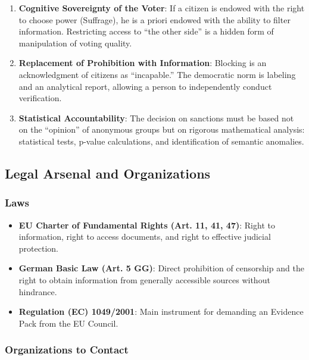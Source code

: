 \documentclass[11pt,a4paper]{article}
\theoremstyle{definition}
\theoremstyle{remark}
\begin{document}
\begin{enumerate}
\item \textbf{Cognitive Sovereignty of the Voter}: If a citizen is endowed with the right to choose power (Suffrage), he is a priori endowed with the ability to filter information. Restricting access to ``the other side'' is a hidden form of manipulation of voting quality.

\item \textbf{Replacement of Prohibition with Information}: Blocking is an acknowledgment of citizens as ``incapable.'' The democratic norm is labeling and an analytical report, allowing a person to independently conduct verification.

\item \textbf{Statistical Accountability}: The decision on sanctions must be based not on the ``opinion'' of anonymous groups but on rigorous mathematical analysis: statistical tests, p-value calculations, and identification of semantic anomalies.
\end{enumerate}

\subsection{Legal Arsenal and Organizations}

\subsubsection{Laws}

\begin{itemize}
\item \textbf{EU Charter of Fundamental Rights (Art. 11, 41, 47)}: Right to information, right to access documents, and right to effective judicial protection.

\item \textbf{German Basic Law (Art. 5 GG)}: Direct prohibition of censorship and the right to obtain information from generally accessible sources without hindrance.

\item \textbf{Regulation (EC) 1049/2001}: Main instrument for demanding an Evidence Pack from the EU Council.
\end{itemize}

\subsubsection{Organizations to Contact}
\end{document}
